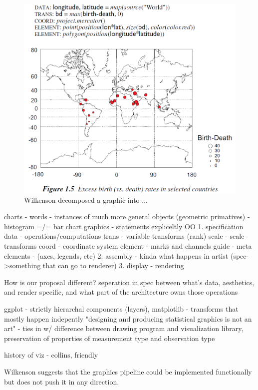 \documentclass[letterpaper,onecolumn,titlepage]{Ythesis}
\begin{document}
\begin{figure}
    \includegraphics{figures/intro/grammar_example.png}
    \caption{Wilkenson decomposed a graphic into ...} 
\end{figure}

charts - words 
    - instances of much more general objects (geometric primatives)
    - histogram =/= bar chart
graphics - statements 
expliceltly OO
    1. specification
        data - operations/computations
        trans - variable transforms (rank)
        scale - scale transforms
        coord - coordinate system
        element - marks and channels
        guide - meta elements - (axes, legends, etc)
    2. assembly - kinda what happens in artist (spec->something that can go to renderer) 
    3. display - rendering

How is our proposal different? seperation in spec between what's data, aesthetics, and render specific, and what part of the architecture owns those operations


ggplot - strictly hierarchal components (layers), matplotlib - transforms that mostly happen indepently 
"designing and producing statistical graphics is not an art" - ties in w/ difference between drawing program and visualization library, preservation of properties of measurement type and observation type \cite{wickhamGgplot2ElegantGraphics2016}

history of viz - collins, friendly


Wilkenson suggests that the graphics pipeline could be implemented functionally but does not push it in any direction. 
\end{document}
